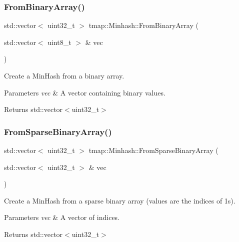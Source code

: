 \subsubsection{\texorpdfstring{From\+Binary\+Array()}{FromBinaryArray()}}
{\footnotesize\ttfamily std\+::vector$<$ uint32\+\_\+t $>$ tmap\+::\+Minhash\+::\+From\+Binary\+Array (\begin{DoxyParamCaption}\item[{std\+::vector$<$ uint8\+\_\+t $>$ \&}]{vec }\end{DoxyParamCaption})}



Create a Min\+Hash from a binary array. 


\begin{DoxyParams}{Parameters}
{\em vec} & A vector containing binary values. \\
\hline
\end{DoxyParams}
\begin{DoxyReturn}{Returns}
std\+::vector$<$uint32\+\_\+t$>$ 
\end{DoxyReturn}
\mbox{\label{classtmap_1_1Minhash_aec48525d1c8006f573b0c534e53d894a}} 
\subsubsection{\texorpdfstring{From\+Sparse\+Binary\+Array()}{FromSparseBinaryArray()}}
{\footnotesize\ttfamily std\+::vector$<$ uint32\+\_\+t $>$ tmap\+::\+Minhash\+::\+From\+Sparse\+Binary\+Array (\begin{DoxyParamCaption}\item[{std\+::vector$<$ uint32\+\_\+t $>$ \&}]{vec }\end{DoxyParamCaption})}



Create a Min\+Hash from a sparse binary array (values are the indices of 1s). 


\begin{DoxyParams}{Parameters}
{\em vec} & A vector of indices. \\
\hline
\end{DoxyParams}
\begin{DoxyReturn}{Returns}
std\+::vector$<$uint32\+\_\+t$>$ 
\end{DoxyReturn}
\mbox{\label{classtmap_1_1Minhash_ab21e92280c7265a8df9477734361b8fc}} 
